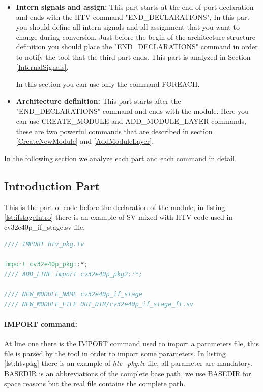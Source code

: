 {{\begin{itemize}
            \item \textbf{Intern signals and assign:} This part starts at the end of port declaration and ends with the HTV command "END\_DECLARATIONS", In this part you should define all intern signals and all assignment that you want to change during conversion. Just before the begin of the architecture structure definition you should place the "END\_DECLARATIONS" command in order to notify the tool that the third part ends. This part is analyzed in Section \ref{InternalSignals}.
            
            In this section you can use only the command FOREACH.
            
            \item \textbf{Architecture definition:} This part starts after the  "END\_DECLARATIONS" command and ends with the module. Here you can use CREATE\_MODULE and ADD\_MODULE\_LAYER commands, these are two powerful commands that are described in section \ref{CreateNewModule} and \ref{AddModuleLayer}.
            
        \end{itemize}
        
        In the following section we analyze each part and each command in detail.
        
        \subsection{Introduction Part}{
            \label{Introduction}
            This is the part of code before the declaration of the module, in listing \ref{lst:ifstageIntro} there is an example of SV mixed with HTV code used in cv32e40p\_if\_stage.sv
            file.
            
            
            \begin{lstlisting}[basicstyle=\ttfamily\scriptsize, language=Verilog, caption=Introduction of cv32e40p if stage, label=lst:ifstageIntro]
//// IMPORT htv_pkg.tv

import cv32e40p_pkg::*;
//// ADD_LINE import cv32e40p_pkg2::*;

//// NEW_MODULE_NAME cv32e40p_if_stage
//// NEW_MODULE_FILE OUT_DIR/cv32e40p_if_stage_ft.sv
            \end{lstlisting}
            
            \paragraph{IMPORT command:}{
                \label{par:import}
                At line one there is the IMPORT command used to import a parameters file, this file is parsed by the tool in order to import some parameters. In listing \ref{lst:htvpkg} there is an example of \textit{htv\_pkg.tv} file, all parameter are mandatory. BASEDIR is an abbreviations of the complete base path, we use BASEDIR for space reasons but the real file contains the complete path. 
                
}}}}
